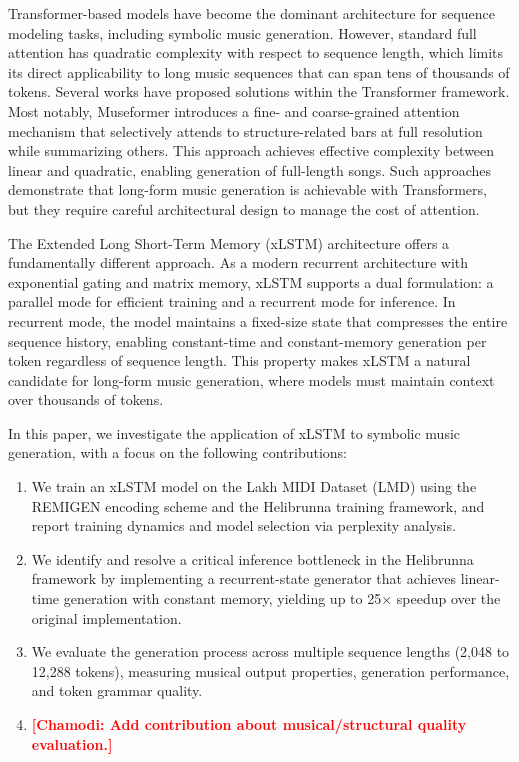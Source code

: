 \documentclass[conference]{IEEEtran}
\newcommand{\placeholder}[1]{\textcolor{red}{\textbf{[#1]}}}
\begin{document}
Transformer-based models have become the dominant architecture for sequence modeling tasks, including symbolic music generation. However, standard full attention has quadratic complexity with respect to sequence length, which limits its direct applicability to long music sequences that can span tens of thousands of tokens. Several works have proposed solutions within the Transformer framework. Most notably, Museformer \cite{yu2022museformer} introduces a fine- and coarse-grained attention mechanism that selectively attends to structure-related bars at full resolution while summarizing others. This approach achieves effective complexity between linear and quadratic, enabling generation of full-length songs. Such approaches demonstrate that long-form music generation is achievable with Transformers, but they require careful architectural design to manage the cost of attention.

The Extended Long Short-Term Memory (xLSTM) architecture \cite{beck2024xlstm} offers a fundamentally different approach. As a modern recurrent architecture with exponential gating and matrix memory, xLSTM supports a dual formulation: a parallel mode for efficient training and a recurrent mode for inference. In recurrent mode, the model maintains a fixed-size state that compresses the entire sequence history, enabling constant-time and constant-memory generation per token regardless of sequence length. This property makes xLSTM a natural candidate for long-form music generation, where models must maintain context over thousands of tokens.

In this paper, we investigate the application of xLSTM to symbolic music generation, with a focus on the following contributions:

\begin{enumerate}
    \item We train an xLSTM model on the Lakh MIDI Dataset (LMD) using the REMIGEN encoding scheme and the Helibrunna training framework, and report training dynamics and model selection via perplexity analysis.
    \item We identify and resolve a critical inference bottleneck in the Helibrunna framework by implementing a recurrent-state generator that achieves linear-time generation with constant memory, yielding up to 25$\times$ speedup over the original implementation.
    \item We evaluate the generation process across multiple sequence lengths (2,048 to 12,288 tokens), measuring musical output properties, generation performance, and token grammar quality.
    \item \placeholder{Chamodi: Add contribution about musical/structural quality evaluation.}
\end{enumerate}
\end{document}

